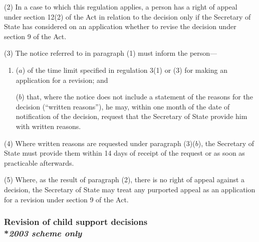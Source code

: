\documentclass[12pt,a4paper]{article}
\begin{document}
(2) In a case to which this regulation applies, a person has a right of appeal under section 12(2) of the Act in relation to the decision only if the Secretary of State has considered on an application whether to revise the decision under section 9 of the Act.

(3) The notice referred to in paragraph (1) must inform the person—
\begin{enumerate}\item[]
($a$) of the time limit specified in regulation 3(1) or (3) for making an application for a revision; and

($b$) that, where the notice does not include a statement of the reasons for the decision (“written reasons”), he may, within one month of the date of notification of the decision, request that the Secretary of State provide him with written reasons.
\end{enumerate}

(4) Where written reasons are requested under paragraph (3)($b$), the Secretary of State must provide them within 14 days of receipt of the request or as soon as practicable afterwards.

(5) Where, as the result of paragraph (2), there is no right of appeal against a decision, the Secretary of State may treat any purported appeal as an application for a revision under section 9 of the Act.


\subsubsection[3A. Revision of child support decisions]{Revision of child support decisions\\*\emph{2003 scheme only}}
\end{document}
